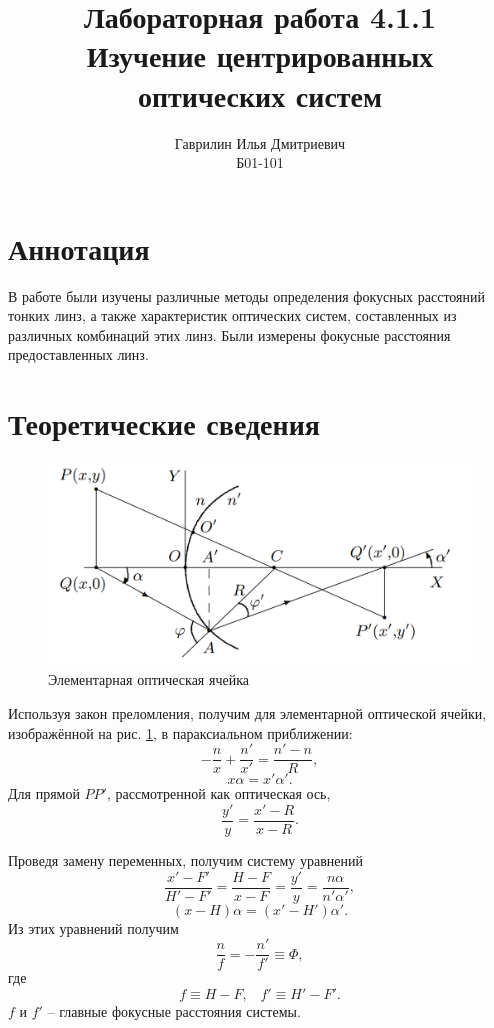 \documentclass[a4paper, 12pt]{article}%
\author{Гаврилин Илья Дмитриевич \\
	Б01-101}
\title{\textbf{Лабораторная работа 4.1.1\\ 
		Изучение центрированных оптических систем}}
\newcommand{\picref}[1]{рис. \ref{#1}}
\begin{document}
	\maketitle
	\section{Аннотация}
	В работе были изучены различные методы определения фокусных расстояний тонких линз, а также характеристик оптических систем, составленных из различных комбинаций этих линз. Были измерены фокусные расстояния предоставленных линз.
	\section{Теоретические сведения}
	\begin{figure}[tbp]
		\centering
		\includegraphics[width=0.8\linewidth]{Screenshot_1}
		\caption{Элементарная оптическая ячейка}
		\label{2}
	\end{figure}
	
	
	Используя закон преломления, получим для элементарной оптической ячейки, изображённой на \picref{2}, в параксиальном приближении:
	\begin{equation}\label{опт-ячейка}
		-\frac{n}{x}+\frac{n'}{x'} = \frac{n'-n}{R},
	\end{equation}
	\begin{equation}
		x \alpha = x' \alpha'.
	\end{equation}
	Для прямой $ P P' $, рассмотренной как оптическая ось, 
	\begin{equation}\label{PP}
		\frac{y'}{y} = \frac{x' - R}{x - R}.
	\end{equation}
	
	Проведя замену переменных, получим систему уравнений
	\begin{equation}\label{grid}
		\frac{x' - F'}{H' - F'}= \frac{H-F}{x- F} = \frac{y'}{y} = \frac{n \alpha}{n' \alpha'},
	\end{equation}
	\begin{equation}\label{grid1}
		(x-H)\alpha= (x' - H')\alpha'.
	\end{equation}
	Из этих уравнений получим
	\begin{equation}\label{Ф}
		\frac{n}{f} = -\frac{n'}{f'} \equiv \Phi,
	\end{equation}
	где
	\begin{equation}\label{focus-len}
		f\equiv H - F, \;\;\; f'\equiv H' - F'.
	\end{equation}
	$ f $ и $ f' $ -- главные фокусные расстояния системы.
	
\end{document}
